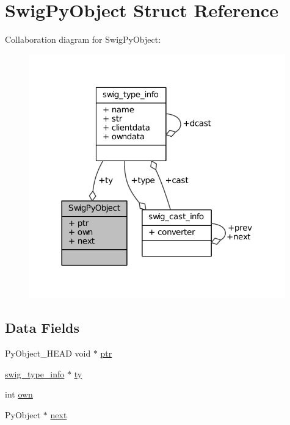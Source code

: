 \hypertarget{struct_swig_py_object}{\section{Swig\-Py\-Object Struct Reference}
\label{struct_swig_py_object}
}


Collaboration diagram for Swig\-Py\-Object\-:
\nopagebreak
\begin{figure}[H]
\begin{center}
\leavevmode
\includegraphics[width=314pt]{struct_swig_py_object__coll__graph}
\end{center}
\end{figure}
\subsection*{Data Fields}
\begin{DoxyCompactItemize}
\item 
Py\-Object\-\_\-\-H\-E\-A\-D void $\ast$ \hyperlink{struct_swig_py_object_a43cee60913250bcaf1ed538ea443a0a7}{ptr}
\item 
\hyperlink{structswig__type__info}{swig\-\_\-type\-\_\-info} $\ast$ \hyperlink{struct_swig_py_object_a6b6270e5da3083fb1e9476b22a0611ad}{ty}
\item 
int \hyperlink{struct_swig_py_object_a4047a08438f6fec73854d5e936100de0}{own}
\item 
Py\-Object $\ast$ \hyperlink{struct_swig_py_object_a6ff221eaf6fa7553a0d69c6caad8c815}{next}
\end{DoxyCompactItemize}


